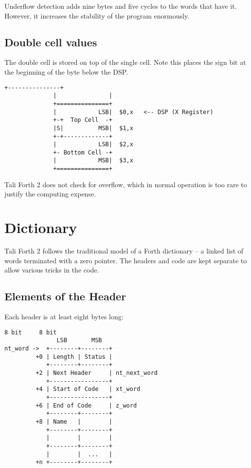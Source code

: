 Underflow detection adds nine bytes and five cycles
to the words that have it. However, it increases the stability of the
program enormously.

\subsection{Double cell values}

The double cell is stored on top of the single cell.  Note this places the sign
bit at the beginning of the byte below the DSP.

\begin{lstlisting}[frame=single]
              +---------------+
              |               |  
              +===============+  
              |            LSB|  $0,x   <-- DSP (X Register) 
              +-+  Top Cell  -+         
              |S|          MSB|  $1,x
              +-+-------------+ 
              |            LSB|  $2,x
              +- Bottom Cell -+         
              |            MSB|  $3,x   
              +===============+ 
\end{lstlisting}

Tali Forth 2 does not check for overflow, which in normal
operation is too rare to justify the computing expense. 

\section{Dictionary}

Tali Forth 2 follows the traditional model of a Forth dictionary -- a linked list
of words terminated with a zero pointer. The headers and code are kept separate
to allow various tricks in the code.


\subsection{Elements of the Header}

Each header is at least eight bytes long:

\begin{lstlisting}[frame=single]
              8 bit     8 bit
               LSB       MSB
nt_word ->  +--------+--------+
         +0 | Length | Status |
            +--------+--------+
         +2 | Next Header     | nt_next_word
            +-----------------+
         +4 | Start of Code   | xt_word 
            +-----------------+
         +6 | End of Code     | z_word
            +--------+--------+
         +8 | Name   |        |
            +--------+--------+
            |        |        |
            +--------+--------+
            |        |  ...   |
         +n +--------+--------+
\end{lstlisting}

